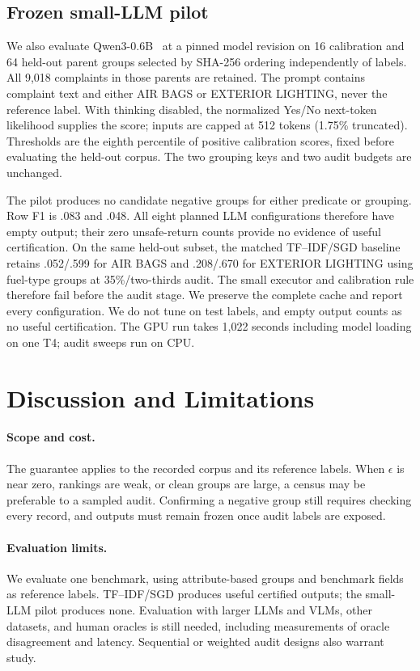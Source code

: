 \documentclass[runningheads]{llncs}
\begin{document}
\subsection{Frozen small-LLM pilot}
We also evaluate Qwen3-0.6B~\cite{qwen3} at a pinned model revision on 16 calibration and 64 held-out parent groups selected by SHA-256 ordering independently of labels. All 9,018 complaints in those parents are retained. The prompt contains complaint text and either AIR BAGS or EXTERIOR LIGHTING, never the reference label. With thinking disabled, the normalized Yes/No next-token likelihood supplies the score; inputs are capped at 512 tokens (1.75\% truncated). Thresholds are the eighth percentile of positive calibration scores, fixed before evaluating the held-out corpus. The two grouping keys and two audit budgets are unchanged.

The pilot produces no candidate negative groups for either predicate or grouping. Row F1 is .083 and .048. All eight planned LLM configurations therefore have empty output; their zero unsafe-return counts provide no evidence of useful certification. On the same held-out subset, the matched TF--IDF/SGD baseline retains .052/.599 for AIR BAGS and .208/.670 for EXTERIOR LIGHTING using fuel-type groups at 35\%/two-thirds audit. The small executor and calibration rule therefore fail before the audit stage. We preserve the complete cache and report every configuration. We do not tune on test labels, and empty output counts as no useful certification. The GPU run takes 1,022 seconds including model loading on one T4; audit sweeps run on CPU.

\section{Discussion and Limitations}
\paragraph{Scope and cost.} The guarantee applies to the recorded corpus and its reference labels. When $\epsilon$ is near zero, rankings are weak, or clean groups are large, a census may be preferable to a sampled audit. Confirming a negative group still requires checking every record, and outputs must remain frozen once audit labels are exposed.

\paragraph{Evaluation limits.} We evaluate one benchmark, using attribute-based groups and benchmark fields as reference labels. TF--IDF/SGD produces useful certified outputs; the small-LLM pilot produces none. Evaluation with larger LLMs and VLMs, other datasets, and human oracles is still needed, including measurements of oracle disagreement and latency. Sequential or weighted audit designs also warrant study.
\end{document}
